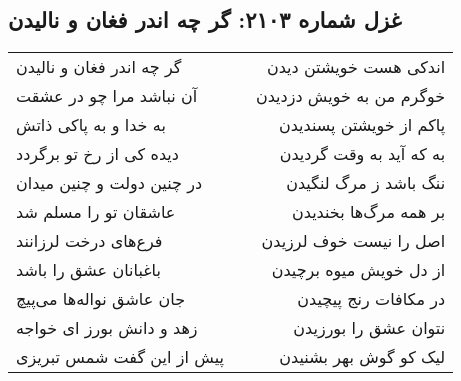 \begin{center}
\section*{غزل شماره ۲۱۰۳: گر چه اندر فغان و نالیدن}
\label{sec:2103}
\begin{longtable}{l p{0.5cm} r}
گر چه اندر فغان و نالیدن
&&
اندکی هست خویشتن دیدن
\\
آن نباشد مرا چو در عشقت
&&
خوگرم من به خویش دزدیدن
\\
به خدا و به پاکی ذاتش
&&
پاکم از خویشتن پسندیدن
\\
دیده کی از رخ تو برگردد
&&
به که آید به وقت گردیدن
\\
در چنین دولت و چنین میدان
&&
ننگ باشد ز مرگ لنگیدن
\\
عاشقان تو را مسلم شد
&&
بر همه مرگ‌ها بخندیدن
\\
فرع‌های درخت لرزانند
&&
اصل را نیست خوف لرزیدن
\\
باغبانان عشق را باشد
&&
از دل خویش میوه برچیدن
\\
جان عاشق نواله‌ها می‌پیچ
&&
در مکافات رنج پیچیدن
\\
زهد و دانش بورز ای خواجه
&&
نتوان عشق را بورزیدن
\\
پیش از این گفت شمس تبریزی
&&
لیک کو گوش بهر بشنیدن
\\
\end{longtable}
\end{center}
